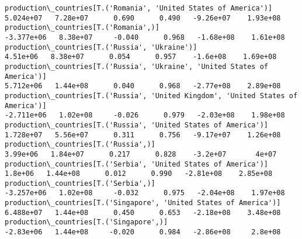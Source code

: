 \documentclass[11pt]{article}
\begin{document}
\begin{Verbatim}[commandchars=\\\{\}]
production\_countries[T.('Romania', 'United States of America')]                                                                                                                        5.024e+07   7.28e+07      0.690      0.490   -9.26e+07    1.93e+08
production\_countries[T.('Romania',)]                                                                                                                                                  -3.377e+06   8.38e+07     -0.040      0.968   -1.68e+08    1.61e+08
production\_countries[T.('Russia', 'Ukraine')]                                                                                                                                           4.51e+06   8.38e+07      0.054      0.957    -1.6e+08    1.69e+08
production\_countries[T.('Russia', 'Ukraine', 'United States of America')]                                                                                                              5.712e+06   1.44e+08      0.040      0.968   -2.77e+08    2.89e+08
production\_countries[T.('Russia', 'United Kingdom', 'United States of America')]                                                                                                      -2.711e+06   1.02e+08     -0.026      0.979   -2.03e+08    1.98e+08
production\_countries[T.('Russia', 'United States of America')]                                                                                                                         1.728e+07   5.56e+07      0.311      0.756   -9.17e+07    1.26e+08
production\_countries[T.('Russia',)]                                                                                                                                                     3.99e+06   1.84e+07      0.217      0.828    -3.2e+07       4e+07
production\_countries[T.('Serbia', 'United States of America')]                                                                                                                           1.8e+06   1.44e+08      0.012      0.990   -2.81e+08    2.85e+08
production\_countries[T.('Serbia',)]                                                                                                                                                   -3.257e+06   1.02e+08     -0.032      0.975   -2.04e+08    1.97e+08
production\_countries[T.('Singapore', 'United States of America')]                                                                                                                      6.488e+07   1.44e+08      0.450      0.653   -2.18e+08    3.48e+08
production\_countries[T.('Singapore',)]                                                                                                                                                 -2.83e+06   1.44e+08     -0.020      0.984   -2.86e+08     2.8e+08

\end{Verbatim}
\end{document}
